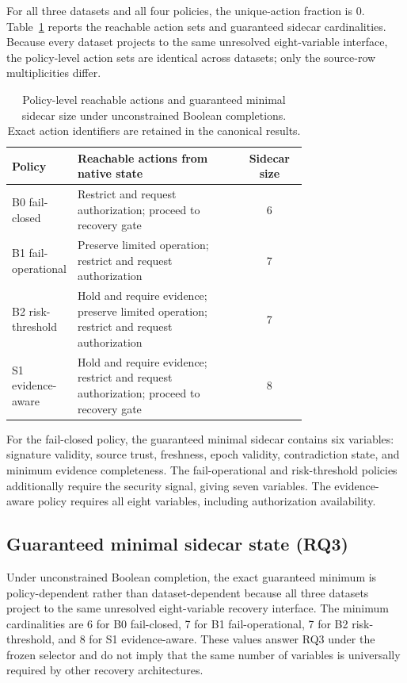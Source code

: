 \documentclass[preprint,12pt]{elsarticle}
\begin{document}
For all three datasets and all four policies, the unique-action fraction is 0. Table~\ref{tab:policies} reports the reachable action sets and guaranteed sidecar cardinalities. Because every dataset projects to the same unresolved eight-variable interface, the policy-level action sets are identical across datasets; only the source-row multiplicities differ.

\begin{table}[htbp]
\centering
\small
\caption{Policy-level reachable actions and guaranteed minimal sidecar size under unconstrained Boolean completions. Exact action identifiers are retained in the canonical results.}
\label{tab:policies}
\begin{tabular}{>{\raggedright\arraybackslash}p{0.18\linewidth}>{\raggedright\arraybackslash}p{0.56\linewidth}c}
\toprule
Policy & Reachable actions from native state & Sidecar size \\
\midrule
B0 fail-closed &
Restrict and request authorization; proceed to recovery gate & 6 \\
B1 fail-operational &
Preserve limited operation; restrict and request authorization & 7 \\
B2 risk-threshold &
Hold and require evidence; preserve limited operation; restrict and request authorization & 7 \\
S1 evidence-aware &
Hold and require evidence; restrict and request authorization; proceed to recovery gate & 8 \\
\bottomrule
\end{tabular}
\end{table}

For the fail-closed policy, the guaranteed minimal sidecar contains six variables: signature validity, source trust, freshness, epoch validity, contradiction state, and minimum evidence completeness. The fail-operational and risk-threshold policies additionally require the security signal, giving seven variables. The evidence-aware policy requires all eight variables, including authorization availability.

\subsection{Guaranteed minimal sidecar state (RQ3)}

Under unconstrained Boolean completion, the exact guaranteed minimum is policy-dependent rather than dataset-dependent because all three datasets project to the same unresolved eight-variable recovery interface. The minimum cardinalities are 6 for B0 fail-closed, 7 for B1 fail-operational, 7 for B2 risk-threshold, and 8 for S1 evidence-aware. These values answer RQ3 under the frozen selector and do not imply that the same number of variables is universally required by other recovery architectures.
\end{document}

